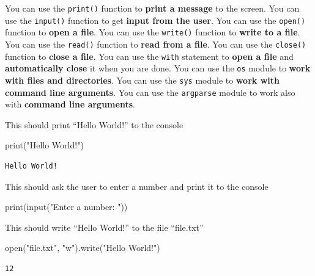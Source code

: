\documentclass[
  letterpaper,
  DIV=11,
  numbers=noendperiod]{scrreprt}
\newenvironment{Shaded}{\begin{snugshade}}{\end{snugshade}}
\newcommand{\BuiltInTok}[1]{\textcolor[rgb]{0.00,0.23,0.31}{#1}}
\newcommand{\NormalTok}[1]{\textcolor[rgb]{0.00,0.23,0.31}{#1}}
\newcommand{\StringTok}[1]{\textcolor[rgb]{0.13,0.47,0.30}{#1}}
\begin{document}

You can use the \texttt{print()} function to \textbf{print a message} to
the screen. You can use the \texttt{input()} function to get
\textbf{input from the user}. You can use the \texttt{open()} function
to \textbf{open a file}. You can use the \texttt{write()} function to
\textbf{write to a file}. You can use the \texttt{read()} function to
\textbf{read from a file}. You can use the \texttt{close()} function to
\textbf{close a file}. You can use the \texttt{with} statement to
\textbf{open a file} and \textbf{automatically close} it when you are
done. You can use the \texttt{os} module to \textbf{work with files and
directories}. You can use the \texttt{sys} module to \textbf{work with
command line arguments}. You can use the \texttt{argparse} module to
work also with \textbf{command line arguments}.

This should print ``Hello World!'' to the console

\begin{Shaded}
\begin{Highlighting}[]
\BuiltInTok{print}\NormalTok{(}\StringTok{"Hello World!"}\NormalTok{)}
\end{Highlighting}
\end{Shaded}

\begin{verbatim}
Hello World!
\end{verbatim}

This should ask the user to enter a number and print it to the console

\begin{Shaded}
\begin{Highlighting}[]
\BuiltInTok{print}\NormalTok{(}\BuiltInTok{input}\NormalTok{(}\StringTok{"Enter a number: "}\NormalTok{))}
\end{Highlighting}
\end{Shaded}

This should write ``Hello World!'' to the file ``file.txt''

\begin{Shaded}
\begin{Highlighting}[]
\BuiltInTok{open}\NormalTok{(}\StringTok{"file.txt"}\NormalTok{, }\StringTok{"w"}\NormalTok{).write(}\StringTok{"Hello World!"}\NormalTok{) }
\end{Highlighting}
\end{Shaded}

\begin{verbatim}
12
\end{verbatim}
\end{document}
